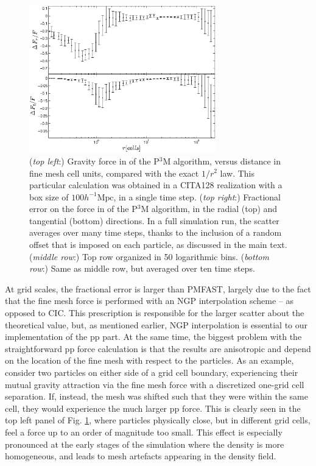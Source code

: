 \begin{figure}
\begin{center}
    \includegraphics[width=3.2in]{graphs/densityForce_fracErr_ppext=0_rebin_N10_new-1.eps}
  \caption{({\it top left}:) Gravity force in of the P$^3$M algorithm, versus distance in fine mesh cell units, compared with the exact $1/r^{2}$ law.
    This particular calculation was obtained in a CITA128 realization with  a box size of $100 h^{-1}\mbox{Mpc}$,
    in a single time step. 
    ({\it top right}:) Fractional error on the force in of the P$^3$M algorithm, in the radial (top) and tangential (bottom) directions.
  In a full simulation run, the scatter averages over many time steps, 
    thanks to the inclusion of a random offset that is imposed on each particle, as discussed in the main text.
    ({\it middle row}:) Top row organized in 50 logarithmic bins.  
    ({\it bottom row}:) Same as middle row, but averaged over ten time steps.
    \label{fig:den_force_fracErr}}
\end{center}
\end{figure}

At grid scales, the fractional error is larger than {\small PMFAST}, largely due to the fact that the fine mesh force is performed with an NGP interpolation scheme -- as opposed to CIC. This prescription is responsible for the larger scatter about the theoretical value, but, as mentioned earlier, 
NGP interpolation is essential to our implementation of the pp part.
At the same time, the biggest problem with the straightforward pp force calculation is that the results 
are anisotropic and depend on the location of the fine mesh with respect 
to the particles. As an example, consider two particles on either side of a grid 
cell boundary, experiencing their mutual gravity attraction via the fine mesh force with a discretized one-grid cell separation.
 If, instead, the mesh was shifted such that they were
within the same cell, they would experience the much larger pp force. 
This is clearly seen in the top left panel of Fig. \ref{fig:den_force_fracErr}, where particles physically close, but in different grid cells, 
feel a force up to an order of magnitude too small.
This effect is especially pronounced at the early stages of the simulation where
the density is more homogeneous, and leads to mesh artefacts appearing
in the density field.

